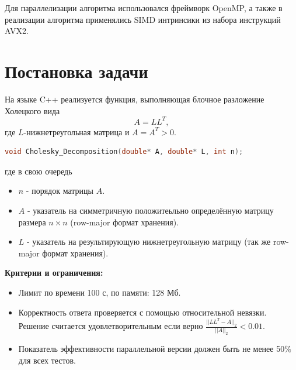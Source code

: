 \documentclass[11pt, a4paper]{article}
\def\newsection#1{
    \section{#1}
}
\begin{document}
Для параллелизации алгоритма использовался фреймворк OpenMP, а также в реализации алгоритма применялись SIMD интринсики из набора инструкций AVX2.


\newsection{Постановка задачи}
На языке C++ реализуется функция, выполняющая блочное разложение Холецкого вида 
\[
    A = LL^T,
\]
где $L$-нижнетреугольная матрица и $A = A^T > 0$.

\begin{lstlisting}[language=C++, frame=single]
    void Cholesky_Decomposition(double* A, double* L, int n);
\end{lstlisting}
где в свою очередь
\begin{itemize}
    \item $n$ - порядок матрицы $A$.
    \item $A$ - указатель на симметричную положитеьльно определённую матрицу размера $n \times n$ (row-major формат хранения).
    \item $L$ - указатель на результирующую нижнетреугольную матрицу (так же row-major формат хранения).
\end{itemize}

\textbf{Критерии и ограничения:}
\begin{itemize}
    \item Лимит по времени 100 с, по памяти: 128 Мб.
    \item Корректность ответа проверяется с помощью относительной невязки. Решение считается удовлетворительным если верно $\frac{|| LL^T - A ||_2}{||A||_2} < 0.01$.
    \item Показатель эффективности параллельной версии должен быть не менее 50\% для всех тестов.
\end{itemize}
\end{document}
